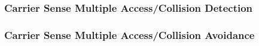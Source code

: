 \subsubsection{Carrier Sense Multiple Access/Collision Detection}\label{subsubsec:CSMACD}

\subsubsection{Carrier Sense Multiple Access/Collision Avoidance}\label{subsubsec:CSMACA}

